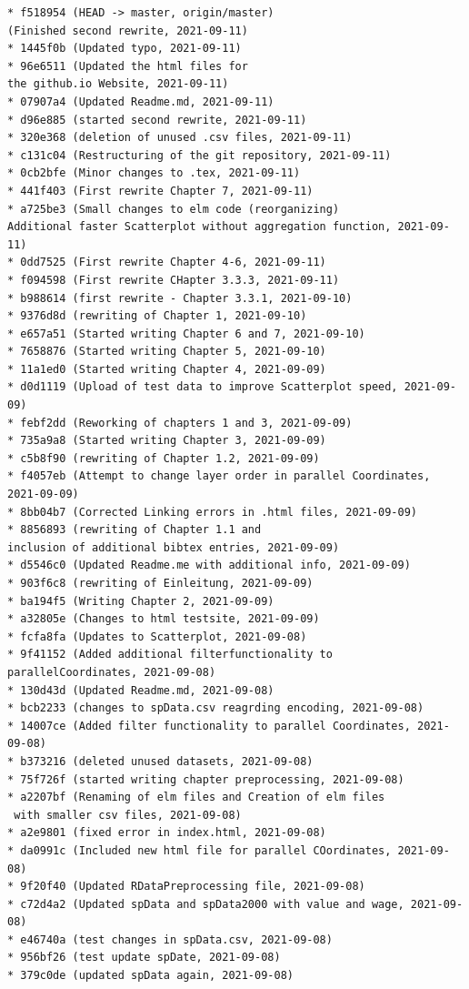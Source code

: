 \documentclass[usegeometry=true]{scrartcl}
\begin{document}
\begin{verbatim}
* f518954 (HEAD -> master, origin/master) 
(Finished second rewrite, 2021-09-11)
* 1445f0b (Updated typo, 2021-09-11)
* 96e6511 (Updated the html files for 
the github.io Website, 2021-09-11)
* 07907a4 (Updated Readme.md, 2021-09-11)
* d96e885 (started second rewrite, 2021-09-11)
* 320e368 (deletion of unused .csv files, 2021-09-11)
* c131c04 (Restructuring of the git repository, 2021-09-11)
* 0cb2bfe (Minor changes to .tex, 2021-09-11)
* 441f403 (First rewrite Chapter 7, 2021-09-11)
* a725be3 (Small changes to elm code (reorganizing) 
Additional faster Scatterplot without aggregation function, 2021-09-11)
* 0dd7525 (First rewrite Chapter 4-6, 2021-09-11)
* f094598 (First rewrite CHapter 3.3.3, 2021-09-11)
* b988614 (first rewrite - Chapter 3.3.1, 2021-09-10)
* 9376d8d (rewriting of Chapter 1, 2021-09-10)
* e657a51 (Started writing Chapter 6 and 7, 2021-09-10)
* 7658876 (Started writing Chapter 5, 2021-09-10)
* 11a1ed0 (Started writing Chapter 4, 2021-09-09)
* d0d1119 (Upload of test data to improve Scatterplot speed, 2021-09-09)
* febf2dd (Reworking of chapters 1 and 3, 2021-09-09)
* 735a9a8 (Started writing Chapter 3, 2021-09-09)
* c5b8f90 (rewriting of Chapter 1.2, 2021-09-09)
* f4057eb (Attempt to change layer order in parallel Coordinates, 2021-09-09)
* 8bb04b7 (Corrected Linking errors in .html files, 2021-09-09)
* 8856893 (rewriting of Chapter 1.1 and 
inclusion of additional bibtex entries, 2021-09-09)
* d5546c0 (Updated Readme.me with additional info, 2021-09-09)
* 903f6c8 (rewriting of Einleitung, 2021-09-09)
* ba194f5 (Writing Chapter 2, 2021-09-09)
* a32805e (Changes to html testsite, 2021-09-09)
* fcfa8fa (Updates to Scatterplot, 2021-09-08)
* 9f41152 (Added additional filterfunctionality to parallelCoordinates, 2021-09-08)
* 130d43d (Updated Readme.md, 2021-09-08)
* bcb2233 (changes to spData.csv reagrding encoding, 2021-09-08)
* 14007ce (Added filter functionality to parallel Coordinates, 2021-09-08)
* b373216 (deleted unused datasets, 2021-09-08)
* 75f726f (started writing chapter preprocessing, 2021-09-08)
* a2207bf (Renaming of elm files and Creation of elm files
 with smaller csv files, 2021-09-08)
* a2e9801 (fixed error in index.html, 2021-09-08)
* da0991c (Included new html file for parallel COordinates, 2021-09-08)
* 9f20f40 (Updated RDataPreprocessing file, 2021-09-08)
* c72d4a2 (Updated spData and spData2000 with value and wage, 2021-09-08)
* e46740a (test changes in spData.csv, 2021-09-08)
* 956bf26 (test update spDate, 2021-09-08)
* 379c0de (updated spData again, 2021-09-08)

\end{verbatim}
\end{document}
